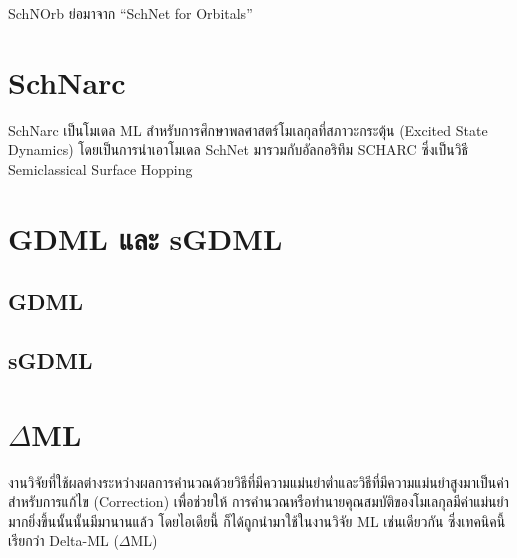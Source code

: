 SchNOrb ย่อมาจาก \enquote{SchNet for Orbitals}\autocite{schutt2019a}

\section{SchNarc}
\label{sec:schnarc}

SchNarc เป็นโมเดล ML สำหรับการศึกษาพลศาสตร์โมเลกุลที่สภาวะกระตุ้น (Excited State Dynamics)\autocite{westermayr2020} 
โดยเป็นการนำเอาโมเดล SchNet\autocite{schutt2017,schutt2018} มารวมกับอัลกอริทึม SCHARC\autocite{richter2011,mai2018} 
ซึ่งเป็นวิธี Semiclassical Surface Hopping

\section{GDML และ sGDML}
\label{sec:gdml_sgdml}

\subsection{GDML}
\label{ssec:gdml}

\autocite{chmiela2017}

\subsection{sGDML}
\label{ssec:sgdml}

\autocite{chmiela2018}

\autocite{sauceda2020}

\section{\texorpdfstring{$\Delta$}-ML}
\label{sec:delta_ML}

งานวิจัยที่ใช้ผลต่างระหว่างผลการคำนวณด้วยวิธีที่มีความแม่นยำต่ำและวิธีที่มีความแม่นยำสูงมาเป็นค่าสำหรับการแก้ไข (Correction) เพื่อช่วยให้%
การคำนวณหรือทำนายคุณสมบัติของโมเลกุลมีค่าแม่นยำมากยิ่งขึ้นนั้นนั้นมีมานานแล้ว\autocite{hu2003,wu2007,balabin2009} โดยไอเดียนี้%
ก็ได้ถูกนำมาใช้ในงานวิจัย ML เช่นเดียวกัน ซึ่งเทคนิคนี้เรียกว่า Delta-ML ($\Delta$ML) 

